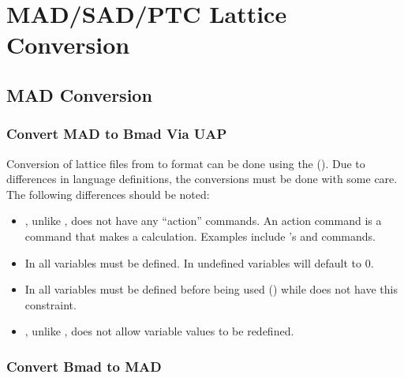 \chapter{MAD/SAD/PTC Lattice Conversion}
\label{c:lat.convert}

\section{MAD Conversion}
\label{s:mad.convert}

\subsection{Convert MAD to Bmad Via UAP}
\label{s:mad.bmad.uap}

Conversion of lattice files from \mad to \bmad format can be done using the  (). 
Due to differences in language definitions, the conversions must be done with some
care. The following differences should be noted:
  \begin{itemize}
  \item
\bmad, unlike \mad, does not have any ``action'' commands. An action
command is a command that makes a calculation. Examples include \mad's
 and  commands.
  \item
In \bmad all variables must be defined. In \mad undefined variables
will default to 0.
  \item
In \bmad all variables must be defined before being used
() while \mad does not have this constraint.
  \item
\bmad, unlike \mad, does not allow variable values to be redefined.
  \end{itemize}

\subsection{Convert Bmad to MAD}
\label{s:bmad.mad}

